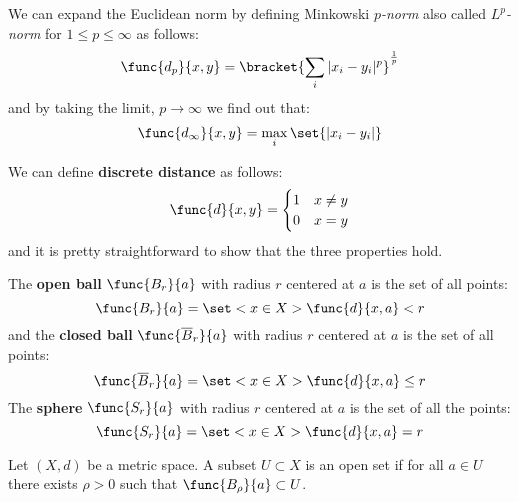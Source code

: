 We can expand the Euclidean norm by defining Minkowski \textit{\(p\)-norm} also called \textit{\(L^p\)-norm} for \(1 \leq p \leq \infty\) as follows:
\begin{equation*}
     \func{d_p}{x,y} = \bracket{\sum_{i}{|x_i - y_i|^p}}^{\frac{1}{p}} 
\end{equation*}
and by taking the limit, \(p \to \infty\) we find out that:
\begin{equation*} 
    \func{d_\infty}{x,y} = \max_{i} \set{|x_i - y_i|} 
\end{equation*}

\begin{example}
    We can define \textbf{discrete distance} as follows:
    \begin{equation*}\func{d}{x,y} =
        \begin{cases}
            1 & x\neq y \\
            0 & x=y
        \end{cases}
    \end{equation*}
    and it is pretty straightforward to show that the three properties hold.
\end{example}

\begin{definition}
    The \textbf{open ball} \(\func{B_r}{a}\) with radius \(r\) centered at \(a\) is the set of all points:
    \begin{equation*}  
        \func{B_r}{a} = \set< x \in X>{ \func{d}{x,a} < r}
     \end{equation*}
    and the \textbf{closed ball} \(\func{\overline{B}_r}{a}\) with radius \(r\) centered at \(a\) is the set of all points:
    \begin{equation*} 
        \func{\overline{B}_r}{a} = \set< x \in X>{\func{d}{x,a} \leq r}  
    \end{equation*}
    The \textbf{sphere} \(\func{S_r}{a}\) with radius \(r\) centered at \(a\) is the set of all the points:
    \begin{equation*}  
        \func{S_r}{a} = \set< x \in X>{ \func{d}{x,a}  = r}  
    \end{equation*}
\end{definition}

\begin{definition}
    Let \((X,d)\) be a metric space. A subset \(U \subset X\) is an open set if for all \(a \in U\) there exists \(\rho > 0\) such that \( \func{B_\rho}{a} \subset U\).
\end{definition}

